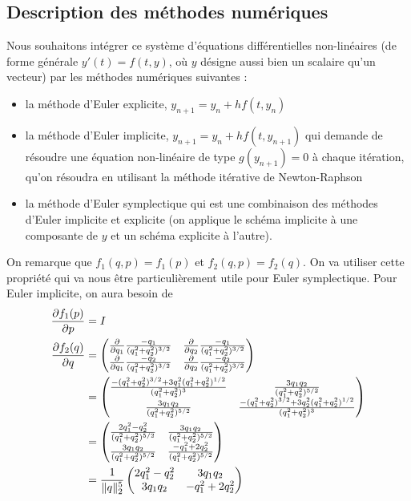 \subsection{Description des méthodes numériques}
Nous souhaitons intégrer ce système d'équations différentielles non-linéaires (de forme générale $y'(t) = f(t,y)$, où $y$ désigne aussi bien un scalaire qu'un vecteur) par les méthodes numériques suivantes :
\begin{itemize}
\item la méthode d'Euler explicite, $y_{n+1} = y_n + h f(t,y_n)$
\item la méthode d'Euler implicite, $y_{n+1} = y_n + h f(t,y_{n+1})$ qui demande de résoudre une équation non-linéaire de type $g(y_{n+1})=0$ à chaque itération, qu'on résoudra en utilisant la méthode itérative de Newton-Raphson
\item la méthode d'Euler symplectique qui est une combinaison des méthodes d'Euler implicite et explicite (on applique le schéma implicite à une composante de $y$ et un schéma explicite à l'autre).
\end{itemize}

On remarque que $f_1(q,p) = f_1(p)$ et $f_2(q,p) = f_2(q)$.
On va utiliser cette propriété qui va nous être particulièrement utile pour Euler symplectique.
Pour Euler implicite, on aura besoin de
\begin{align*}
  \frac{\partial f_1(p)}{\partial p} & = I\\
  \frac{\partial f_2(q)}{\partial q} & =
  \begin{pmatrix}
    \frac{\partial }{\partial q_1}\frac{-q_1}{(q_1^2 + q_2^2)^{3/2}} &
    \frac{\partial }{\partial q_2}\frac{-q_1}{(q_1^2 + q_2^2)^{3/2}}\\
    \frac{\partial }{\partial q_1}\frac{-q_2}{(q_1^2 + q_2^2)^{3/2}} &
    \frac{\partial }{\partial q_2}\frac{-q_2}{(q_1^2 + q_2^2)^{3/2}}
  \end{pmatrix}\\
  & =
  \begin{pmatrix}
    \frac{-(q_1^2 + q_2^2)^{3/2} + 3q_1^2(q_1^2 + q_2^2)^{1/2}}{(q_1^2 + q_2^2)^3} &
    \frac{3q_1q_2}{(q_1^2 + q_2^2)^{5/2}}\\
    \frac{3q_1q_2}{(q_1^2 + q_2^2)^{5/2}} &
    \frac{-(q_1^2 + q_2^2)^{3/2} + 3q_2^2(q_1^2 + q_2^2)^{1/2}}{(q_1^2 + q_2^2)^3}
  \end{pmatrix}\\
  & =
  \begin{pmatrix}
    \frac{2q_1^2 - q_2^2}{(q_1^2 + q_2^2)^{5/2}} &
    \frac{3q_1q_2}{(q_1^2 + q_2^2)^{5/2}}\\
    \frac{3q_1q_2}{(q_1^2 + q_2^2)^{5/2}} &
    \frac{-q_1^2 + 2q_2^2}{(q_1^2 + q_2^2)^{5/2}}
  \end{pmatrix}\\
  & =
  \frac{1}{\|q\|_2^{5}}
  \begin{pmatrix}
    2q_1^2 - q_2^2 &
    3q_1q_2\\
    3q_1q_2 &
    -q_1^2 + 2q_2^2
  \end{pmatrix}
\end{align*}

